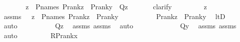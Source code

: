\begin{isabellebody}
\ \ \ \ \isamarkupfalse%
\ \isamarkupfalse%
\ {\isachardoublequoteopen}{\isasymforall}z\ {\isasymin}\ P{\isacharunderscore}{\kern0pt}names{\isachardot}{\kern0pt}\ P{\isacharunderscore}{\kern0pt}rank{\isacharparenleft}{\kern0pt}z{\isacharparenright}{\kern0pt}\ {\isacharless}{\kern0pt}\ P{\isacharunderscore}{\kern0pt}rank{\isacharparenleft}{\kern0pt}y{\isacharparenright}{\kern0pt}\ {\isasymlongrightarrow}\ Q{\isacharparenleft}{\kern0pt}z{\isacharparenright}{\kern0pt}{\isachardoublequoteclose}\ \isanewline
\ \ \ \ \isamarkupfalse%
\ {\isacharparenleft}{\kern0pt}clarify{\isacharparenright}{\kern0pt}\ \isanewline
\ \ \ \ \ \ \isamarkupfalse%
\ z\ \isamarkupfalse%
\ assms{}\ {\isacharcolon}{\kern0pt}\ \ {\isachardoublequoteopen}z\ {\isasymin}\ P{\isacharunderscore}{\kern0pt}names{\isachardoublequoteclose}\ {\isachardoublequoteopen}P{\isacharunderscore}{\kern0pt}rank{\isacharparenleft}{\kern0pt}z{\isacharparenright}{\kern0pt}\ {\isacharless}{\kern0pt}\ P{\isacharunderscore}{\kern0pt}rank{\isacharparenleft}{\kern0pt}y{\isacharparenright}{\kern0pt}{\isachardoublequoteclose}\ \isanewline
\ \ \ \ \ \ \isamarkupfalse%
\ \isamarkupfalse%
\ {\isachardoublequoteopen}P{\isacharunderscore}{\kern0pt}rank{\isacharparenleft}{\kern0pt}z{\isacharparenright}{\kern0pt}\ {\isasymin}\ P{\isacharunderscore}{\kern0pt}rank{\isacharparenleft}{\kern0pt}y{\isacharparenright}{\kern0pt}{\isachardoublequoteclose}\ \isamarkupfalse%
\ ltD\ \isamarkupfalse%
\ auto\ \isanewline
\ \ \ \ \ \ \isamarkupfalse%
\ \isamarkupfalse%
\ {\isachardoublequoteopen}Q{\isacharparenleft}{\kern0pt}z{\isacharparenright}{\kern0pt}{\isachardoublequoteclose}\ \isamarkupfalse%
\ assms{}\ assms{}\ \isamarkupfalse%
\ auto\ \isanewline
\ \ \ \ \isamarkupfalse%
\isanewline
\ \ \ \ \isamarkupfalse%
\ \isamarkupfalse%
\ {\isachardoublequoteopen}Q{\isacharparenleft}{\kern0pt}y{\isacharparenright}{\kern0pt}{\isachardoublequoteclose}\ \isamarkupfalse%
\ assms\ assms{}\ \isamarkupfalse%
\ auto\ \isanewline
\ \ \isamarkupfalse%
\isanewline
\ \ \isamarkupfalse%
\ \isamarkupfalse%
\ {\isachardoublequoteopen}R{\isacharparenleft}{\kern0pt}P{\isacharunderscore}{\kern0pt}rank{\isacharparenleft}{\kern0pt}x{\isacharparenright}{\kern0pt}{\isacharparenright}{\kern0pt}{\isachardoublequoteclose}\isanewline

\end{isabellebody}
